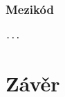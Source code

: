 \documentclass[12pt,a4paper]{article}
\begin{document}
\subsubsection{Mezikód}

\begin{verbatim}
...
\end{verbatim}



\section{Závěr}


\end{document}
